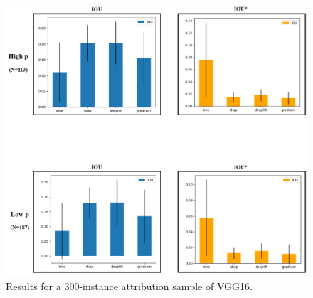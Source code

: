 \documentclass[main]{subfiles}
\begin{document}
\begin{figure}[h]\centering
\vfill
\includegraphics[scale=0.30]{appendix_C.png}
\caption{Results for a 300-instance attribution sample of VGG16. }
\label{vggAfig}
\vfill
\end{figure}
\end{document}

